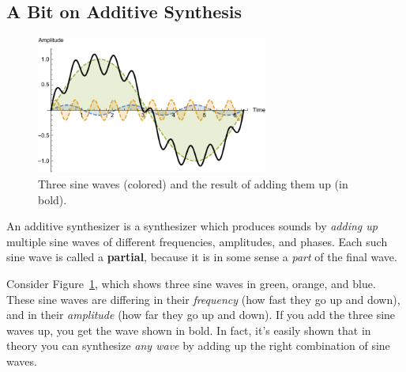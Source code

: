 \documentclass{article}
\begin{document}
\subsection{A Bit on Additive Synthesis}  
\label{additivesynthesis}

\begin{figure}
\vspace{-1em}
\includegraphics[width=3in]{sinewaves}
\caption{Three sine waves (colored) and the result of adding them up (in bold).}
\label{sinewaves}
\vspace{-1em}
\end{figure}

An additive synthesizer is a synthesizer which produces sounds by {\it adding up} multiple sine waves of different frequencies, amplitudes, and phases.  Each such sine wave is called a {\bf partial}, because it is in some sense a {\it part} of the final wave.

Consider Figure~\ref{sinewaves}, which shows three sine waves in green, orange, and blue.  These sine waves are differing in their {\it frequency} (how fast they go up and down), and in their {\it amplitude} (how far they go up and down).  If you add the three sine waves up, you get the wave shown in bold.  In fact, it's easily shown that in theory you can synthesize {\it any wave} by adding up the right combination of sine waves.
\end{document}
